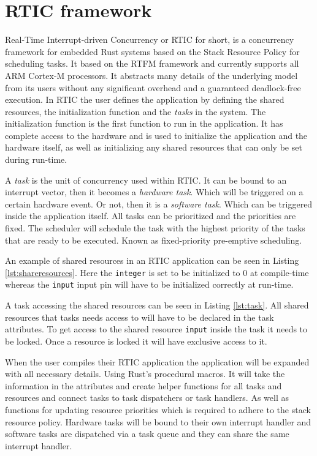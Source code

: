 \section{RTIC framework}
Real-Time Interrupt-driven Concurrency or RTIC for short, is a concurrency
framework for embedded Rust systems based on the Stack Resource Policy for
scheduling tasks. It based on the RTFM framework\cite{rtfm} and currently
supports all ARM Cortex-M processors. It abstracts many details of the underlying
model from its users without any significant overhead and a guaranteed
deadlock-free execution. In RTIC the user defines the application by defining
the shared resources, the initialization function and the \emph{tasks} in the
system. The initialization function is the first function to run in the
application. It has complete access to the hardware and is used to initialize
the application and the hardware itself, as well as initializing any shared
resources that can only be set during run-time.

A \emph{task} is the unit of concurrency used within RTIC. It can be bound to
an interrupt vector, then it becomes a \emph{hardware task}. Which will be
triggered on a certain hardware event. Or not, then it is a \emph{software
task}. Which can be triggered inside the application itself. All tasks can be
prioritized and the priorities are fixed. The scheduler will schedule
the task with the highest priority of the tasks that are ready to be executed.
Known as fixed-priority pre-emptive scheduling\cite{fixedpriorityhistory}.

An example of shared resources in an RTIC application can be seen in Listing
\ref{lst:shareresources}. Here the \texttt{integer} is set to be initialized to
$0$ at compile-time whereas the \texttt{input} input pin will have to be initialized
correctly at run-time.


A task accessing the shared resources can be seen in Listing \ref{lst:task}.
All shared resources that tasks needs access to will have to be declared in the
task attributes. To get access to the shared resource \texttt{input} inside the
task it needs to be locked. Once a resource is locked it will have exclusive
access to it.


When the user compiles their RTIC application the application will be expanded
with all necessary details. Using Rust's procedural macros. It will take the
information in the attributes and create helper functions for all tasks and
resources and connect tasks to task dispatchers or task handlers. As well as
functions for updating resource priorities which is required to adhere to the
stack resource policy. Hardware tasks will be bound to their own interrupt handler
and software tasks are dispatched via a task queue and they can share the same
interrupt handler.

